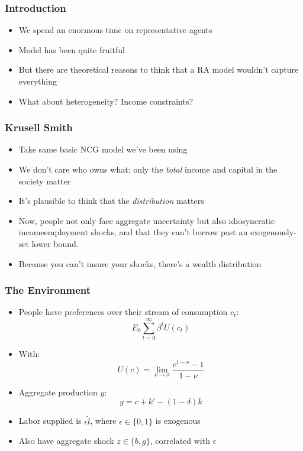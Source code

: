 \documentclass{beamer}
\author{Trevor Gallen}
\date{}
\begin{document}
\renewcommand*{\inserttotalframenumber}{\pageref{lastframe}}

\begin{frame}
\titlepage
\end{frame}

\begin{frame}
\frametitle[alignment=center]{Introduction}
\begin{itemize}
\item We spend an enormous time on representative agents
\bigskip
\item Model has been quite fruitful
\bigskip
\item But there are theoretical reasons to think that a RA model wouldn't capture everything
\bigskip
\item What about heterogeneity?  Income constraints?
\end{itemize}
\end{frame}

\begin{frame}
\frametitle[alignment=center]{Krusell Smith}
\begin{itemize}
\item Take same basic NCG model we've been using
\bigskip
\item We don't care who owns what: only the \emph{total} income and capital in the society matter
\bigskip
\item It's plausible to think that the \emph{distribution} matters
\bigskip
\item Now, people not only face aggregate uncertainty but also idiosyncratic income\/employment shocks, and that they can't borrow past an exogenously-set lower bound.
\bigskip
\item Because you can't insure your shocks, there's a wealth distribution
\end{itemize}
\end{frame}

\begin{frame}
\frametitle[alignment=center]{The Environment}
\begin{itemize}
\item People have preferences over their stream of consumption $c_t$:
$$E_0\sum_{t=0}^\infty \beta^tU(c_t)$$
\item With:
$$U(c)=\underset{\nu\rightarrow \sigma}{\lim}\frac{c^{1-\nu}-1}{1-\nu}$$
\item Aggregate production $y$:
$$y=c+k'-(1-\delta)k$$
\item Labor supplied is $\epsilon\tilde{l}$, where $\epsilon\in\{0,1\}$ is exogenous
\bigskip
\item Also have aggregate shock $z\in\{b,g\}$, correlated with $\epsilon$
\end{itemize}
\end{frame}
\end{document}
